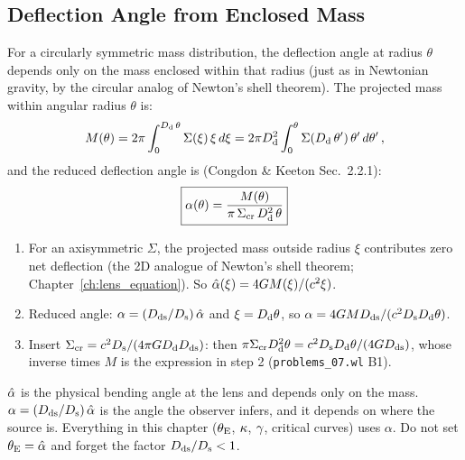 \subsection{Deflection Angle from Enclosed Mass}

For a circularly symmetric mass distribution, the deflection angle at
radius $\theta$ depends only on the mass enclosed within that radius
(just as in Newtonian gravity, by the circular analog of Newton's
shell theorem).  The projected mass within angular radius $\theta$ is:
\begin{equation}
    M(\theta) = 2\pi \int_0^{D_{\mathrm{d}}\,\theta}
    \Sigma(\xi)\, \xi\, d\xi
    = 2\pi D_{\mathrm{d}}^2 \int_0^\theta
    \Sigma(D_{\mathrm{d}}\,\theta')\, \theta'\, d\theta' \,,
    \label{eq:enclosed_mass}
\end{equation}
and the reduced deflection angle is
(Congdon \& Keeton Sec.~2.2.1):
\begin{equation}
    \boxed{
    \alpha(\theta) = \frac{M(\theta)}{\pi\, \Sigma_{\mathrm{cr}}\, D_{\mathrm{d}}^2\, \theta}
    }
    \label{eq:alpha_enclosed_mass}
\end{equation}

\begin{derivation}[From $\alphahat = 4\Gnewton M/\speedoflight^2\xi$ to eq.~\eqref{eq:alpha_enclosed_mass}]
\begin{enumerate}[nosep]
  \item For an axisymmetric $\Sigma$, the projected mass outside radius $\xi$
        contributes zero net deflection (the 2D analogue of Newton's shell
        theorem; Chapter~\ref{ch:lens_equation}).  So
        $\hat{\alpha}(\xi) = 4G M(\xi)/(c^2\xi)$.
  \item Reduced angle: $\alpha = (D_{\mathrm{ds}}/D_{\mathrm{s}})\,\hat{\alpha}$ and $\xi = D_{\mathrm{d}}\theta$, so
        $\alpha = 4G MD_{\mathrm{ds}}/(c^2D_{\mathrm{s}}D_{\mathrm{d}}\theta)$.
  \item Insert $\Sigma_{\mathrm{cr}} = c^2D_{\mathrm{s}}/(4\pi GD_{\mathrm{d}}D_{\mathrm{ds}})$: then
        $\pi\Sigma_{\mathrm{cr}}D_{\mathrm{d}}^2\theta = c^2D_{\mathrm{s}}D_{\mathrm{d}}\theta/(4GD_{\mathrm{ds}})$, whose
        inverse times $M$ is the expression in step 2
        (\texttt{problems\_07.wl} B1).
\end{enumerate}
\end{derivation}

\begin{annotation}
$\hat{\alpha}$ is the physical bending angle at the lens and depends only on the
mass.  $\alpha = (D_{\mathrm{ds}}/D_{\mathrm{s}})\,\hat{\alpha}$ is the angle the observer infers,
and it depends on where the source is.  Everything in this chapter ($\theta_{\mathrm{E}}$,
$\kappa$, $\gamma$, critical curves) uses $\alpha$.  Do not
set $\theta_{\mathrm{E}} = \hat{\alpha}$ and forget the factor $D_{\mathrm{ds}}/D_{\mathrm{s}}<1$.
\end{annotation}

